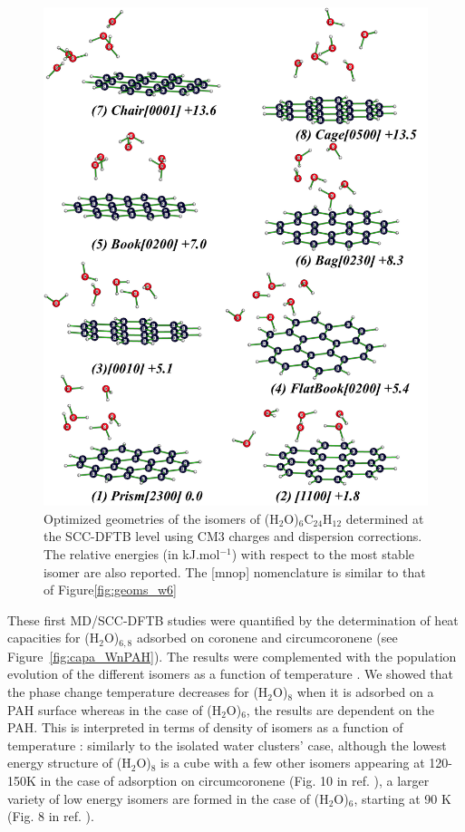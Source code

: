\documentclass[]{interact}
\theoremstyle{plain}%
\theoremstyle{definition}
\theoremstyle{remark}
\begin{document}
	
\begin{figure}[!ht]
\includegraphics[width=12cm]{geoms_w6cor.png}
\caption{Optimized geometries of the isomers of (H$_2$O)$_6$C$_{24}$H$_{12}$ determined at the SCC-DFTB level using CM3 charges and dispersion corrections. The relative energies (in kJ.mol$^{-1}$) with respect to the most stable isomer are also reported. The [mnop] nomenclature is similar to that of Figure\ref{fig:geoms_w6} }
\label{fig:geoms_w6cor}
\end{figure}

	
	
	These first MD/SCC-DFTB studies were quantified by the determination of heat capacities for (H$_2$O)$_{6,8}$ adsorbed on coronene and circumcoronene (see Figure~\ref{fig:capa_WnPAH}). The results were complemented with the population evolution of the different isomers as a function of temperature \cite{Oliveira2015}. We showed that the phase change temperature decreases for (H$_2$O)$_8$ when it is adsorbed on a PAH surface whereas in the case of (H$_2$O)$_6$, the results are dependent on the PAH.  This is interpreted in terms of density of isomers as a function of temperature : similarly to the isolated water clusters' case, although the lowest energy structure of (H$_2$O)$_8$ is a cube with a few other isomers appearing at 120-150K  in the case of adsorption on circumcoronene (Fig. 10 in ref. \cite{Oliveira2015}), a larger variety of low energy isomers are formed in the case of (H$_2$O)$_6$, starting at 90 K (Fig. 8 in ref.  \cite{Oliveira2015}).
	
\end{document}
